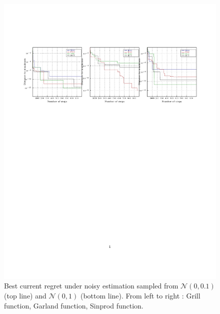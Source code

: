 \documentclass[a4paper,10pt]{article}
\begin{document}
\begin{figure}
\vspace{-10cm}
\hspace{-5cm}
\includegraphics[trim={0 6cm 0 4cm},clip]{best1000_1.pdf}
\vspace{-10cm}
 \caption{\label{fig:noise01}Best current regret under noisy estimation sampled from $\mathcal{N}(0,0.1)$ (top line) and $\mathcal{N}(0,1)$ (bottom line). From left to right : Grill function, Garland function, Sinprod function.}
\end{figure}
\end{document}
